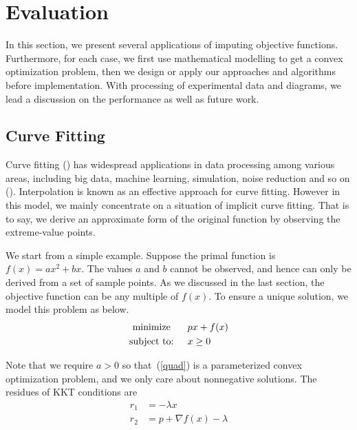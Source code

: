 \section{Evaluation}\label{sec:evaluation}

In this section, we present several applications of imputing objective functions. Furthermore, for each case, we first use mathematical modelling to get a convex optimization problem, then we design or apply our approaches and algorithms before implementation. With processing of experimental data and diagrams, we lead a discussion on the performance as well as future work.

\subsection{Curve Fitting}

Curve fitting () has widespread applications in data processing among various areas, including big data, machine learning, simulation, noise reduction and so on (). Interpolation is known as an effective approach for curve fitting. However in this model, we mainly concentrate on a situation of implicit curve fitting. That is to say, we derive an approximate form of the original function by observing the extreme-value points.

We start from a simple example. Suppose the primal function is $f(x)=ax^2+bx$. The values $a$ and $b$ cannot be observed, and hence can only be derived from a set of sample points. As we discussed in the last section, the objective function can be any multiple of $f(x)$. To ensure a unique solution, we model this problem as below.
\begin{align}
\begin{split}\label{quad}
\textrm{minimize }\hspace{.2in}&px+f(x)\\
\textrm{subject to:}\hspace{.2in}&x\ge0
\end{split}
\end{align}

Note that we require $a>0$ so that~(\ref{quad}) is a parameterized convex optimization problem, and we only care about nonnegative solutions. The residues of KKT conditions are
\begin{align*}
r_1 &= -\lambda x\\
r_2 &= p+\nabla f(x)-\lambda
\end{align*}

